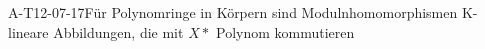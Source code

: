 
\begin{EXA}{A-T12-07-17}{Für Polynomringe in Körpern sind Modulnhomomorphismen K-lineare Abbildungen, die mit $X*$ Polynom kommutieren}
\end{EXA}

